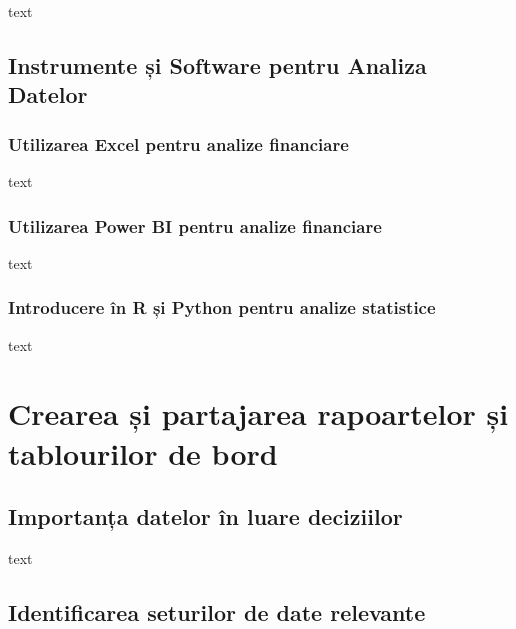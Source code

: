 \documentclass[
  11pt,
  b5paper,
  nottoc]{book}
\begin{document}
text

\hypertarget{instrumente-ux219i-software-pentru-analiza-datelor-4}{%
\section{Instrumente și Software pentru Analiza
Datelor}\label{instrumente-ux219i-software-pentru-analiza-datelor-4}}

\hypertarget{utilizarea-excel-pentru-analize-financiare-4}{%
\subsection{Utilizarea Excel pentru analize
financiare}\label{utilizarea-excel-pentru-analize-financiare-4}}

text

\hypertarget{utilizarea-power-bi-pentru-analize-financiare-4}{%
\subsection{Utilizarea Power BI pentru analize
financiare}\label{utilizarea-power-bi-pentru-analize-financiare-4}}

text

\hypertarget{introducere-uxeen-r-ux219i-python-pentru-analize-statistice-4}{%
\subsection{Introducere în R și Python pentru analize
statistice}\label{introducere-uxeen-r-ux219i-python-pentru-analize-statistice-4}}

text


\hypertarget{cap6}{%
\chapter{Crearea și partajarea rapoartelor și tablourilor de
bord}\label{cap6}}

\hypertarget{importanux21ba-datelor-uxeen-luare-deciziilor-5}{%
\section{Importanța datelor în luare
deciziilor}\label{importanux21ba-datelor-uxeen-luare-deciziilor-5}}

text

\hypertarget{identificarea-seturilor-de-date-relevante-5}{%
\section{Identificarea seturilor de date
relevante}\label{identificarea-seturilor-de-date-relevante-5}}
\end{document}
